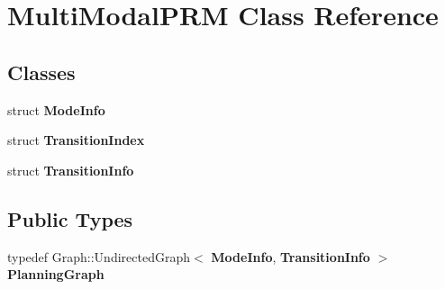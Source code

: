 \section{Multi\+Modal\+P\+RM Class Reference}
\label{classMultiModalPRM}
\subsection*{Classes}
\begin{DoxyCompactItemize}
\item 
struct {\bf Mode\+Info}
\item 
struct {\bf Transition\+Index}
\item 
struct {\bf Transition\+Info}
\end{DoxyCompactItemize}
\subsection*{Public Types}
\begin{DoxyCompactItemize}
\item 
typedef Graph\+::\+Undirected\+Graph$<$ {\bf Mode\+Info}, {\bf Transition\+Info} $>$ {\bfseries Planning\+Graph}\label{classMultiModalPRM_ab20dcf0c96259018f5140f9aaf90af40}

\end{DoxyCompactItemize}
